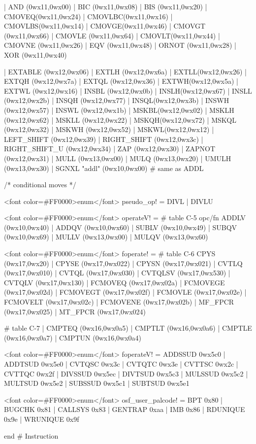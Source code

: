 \begin{SML}
     | AND   (0wx11,0wx00) | BIC    (0wx11,0wx08) | BIS    (0wx11,0wx20)
     | CMOVEQ(0wx11,0wx24) | CMOVLBC(0wx11,0wx16) | CMOVLBS(0wx11,0wx14)
     | CMOVGE(0wx11,0wx46) | CMOVGT (0wx11,0wx66) | CMOVLE (0wx11,0wx64)
     | CMOVLT(0wx11,0wx44) | CMOVNE (0wx11,0wx26) | EQV (0wx11,0wx48)
     | ORNOT (0wx11,0wx28) | XOR    (0wx11,0wx40)

     | EXTABLE (0wx12,0wx06) | EXTLH  (0wx12,0wx6a) | EXTLL(0wx12,0wx26)
     | EXTQH (0wx12,0wx7a) | EXTQL  (0wx12,0wx36) | EXTWH(0wx12,0wx5a)
     | EXTWL (0wx12,0wx16) | INSBL  (0wx12,0wx0b) | INSLH(0wx12,0wx67)
     | INSLL (0wx12,0wx2b) | INSQH  (0wx12,0wx77) | INSQL(0wx12,0wx3b)
     | INSWH (0wx12,0wx57) | INSWL  (0wx12,0wx1b) | MSKBL(0wx12,0wx02)
     | MSKLH (0wx12,0wx62) | MSKLL  (0wx12,0wx22) | MSKQH(0wx12,0wx72)
     | MSKQL (0wx12,0wx32) | MSKWH  (0wx12,0wx52) | MSKWL(0wx12,0wx12)
     | LEFT_SHIFT   (0wx12,0wx39) | RIGHT_SHIFT    (0wx12,0wx3c) | RIGHT_SHIFT_U  (0wx12,0wx34)
     | ZAP   (0wx12,0wx30) | ZAPNOT (0wx12,0wx31)
     | MULL  (0wx13,0wx00)                        | MULQ (0wx13,0wx20)
                           | UMULH  (0wx13,0wx30) 
     | SGNXL "addl" (0wx10,0wx00) #  same as ADDL 

   /* conditional moves */ 
 
   <font color=#FF0000>enum</font> pseudo_op! = DIVL | DIVLU
 
   <font color=#FF0000>enum</font> operateV! = #  table C-5 opc/fn 
        ADDLV (0wx10,0wx40) | ADDQV (0wx10,0wx60)
      | SUBLV (0wx10,0wx49) | SUBQV (0wx10,0wx69) 
      | MULLV (0wx13,0wx00) | MULQV (0wx13,0wx60)
 
   <font color=#FF0000>enum</font> foperate! =   #  table C-6 
      CPYS    (0wx17,0wx20)  | CPYSE (0wx17,0wx022)    | CPYSN   (0wx17,0wx021)
    | CVTLQ   (0wx17,0wx010) | CVTQL (0wx17,0wx030)    | CVTQLSV (0wx17,0wx530)
    | CVTQLV  (0wx17,0wx130)
    | FCMOVEQ (0wx17,0wx02a) | FCMOVEGE (0wx17,0wx02d) | FCMOVEGT (0wx17,0wx02f)
    | FCMOVLE (0wx17,0wx02e) | FCMOVELT (0wx17,0wx02c) | FCMOVENE (0wx17,0wx02b)
    | MF_FPCR (0wx17,0wx025) | MT_FPCR  (0wx17,0wx024)

                         #  table C-7 
    | CMPTEQ  (0wx16,0wx0a5) | CMPTLT (0wx16,0wx0a6)   | CMPTLE  (0wx16,0wx0a7)
    | CMPTUN  (0wx16,0wx0a4)

   <font color=#FF0000>enum</font> foperateV! = 
          ADDSSUD  0wx5c0
        | ADDTSUD  0wx5e0
        | CVTQSC   0wx3c
        | CVTQTC   0wx3e
        | CVTTSC   0wx2c
        | CVTTQC   0wx2f
        | DIVSSUD  0wx5ec
        | DIVTSUD  0wx5c3
        | MULSSUD  0wx5c2
        | MULTSUD  0wx5e2
        | SUBSSUD  0wx5c1
        | SUBTSUD  0wx5e1
 
   <font color=#FF0000>enum</font> osf_user_palcode! = 
      BPT 0x80 | BUGCHK 0x81 | CALLSYS 0x83 
    | GENTRAP 0xaa | IMB 0x86 | RDUNIQUE 0x9e | WRUNIQUE 0x9f

   end #  Instruction 
\end{SML}

